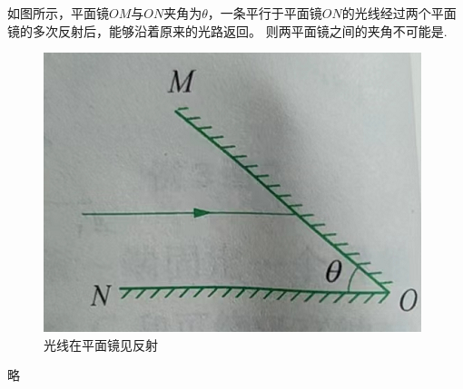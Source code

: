 \documentclass[windows,csize4]{BHCexam}
\begin{document}
\begin{groups}
\begin{questions}[]
        \question[5] 如图所示，平面镜$OM$与$ON$夹角为$\theta$，一条平行于平面镜$ON$的光线经过两个平面镜的多次反射后，能够沿着原来的光路返回。
        则两平面镜之间的夹角不可能是.
        \begin{figure}[htb]
            \centering
            \includegraphics [scale=0.5,trim=0 0 0 0]{./image/fig_3_17.PNG}
            \caption{光线在平面镜见反射}
            \label{fig:fig_3_17}
        \end{figure}
        \begin{solution}{0.5cm}
            \methodonly 略
        \end{solution}


    \end{questions}
\end{groups}
\label{lastpage}
\end{document}
